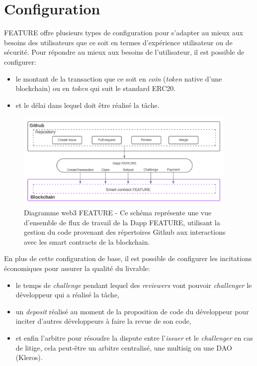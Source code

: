 \documentclass[
	a4paper, %
	10pt, %
	unnumberedsections, %
	twoside, %
]{LTJournalArticle}
\begin{document}
\section{Configuration}

FEATURE offre plusieurs types de configuration pour s'adapter au mieux aux besoins des utilisateurs que ce soit en termes d'expérience utilisateur ou de sécurité. Pour répondre au mieux aux besoins de l'utilisateur, il est possible de configurer:

\begin{itemize}
\item
  le montant de la transaction que ce soit en \emph{coin} (\emph{token} native d'une blockchain) ou en \emph{token} qui suit le standard ERC20.
\item
  et le délai dans lequel doit être réalisé la tâche.
\end{itemize}

\begin{figure}[ht]
  \centering
  \includegraphics[width=0.95\textwidth]{media/diagram_web3_Feature.png}
  \caption{Diagramme web3 FEATURE - Ce schéma représente une vue d'ensemble de flux de travail de la Dapp FEATURE, utilisant la gestion du code provenant des répertoires Github aux interactions avec les smart contracts de la blockchain.}
  \label{fig:web3 diagram}
\end{figure}

En plus de cette configuration de base, il est possible de configurer les incitations économiques pour assurer la qualité du livrable:

\begin{itemize}
\item
  le temps de \emph{challenge} pendant lequel des \emph{reviewers} vont pouvoir \emph{challenger} le développeur qui a réalisé la tâche,
\item
  un \emph{deposit} réalisé au moment de la proposition de code du développeur pour inciter d'autres développeurs à faire la revue de son code,
\item
  et enfin l'arbitre pour résoudre la dispute entre l'\emph{issuer} et le \emph{challenger} en cas de litige, cela peut-être un arbitre centralisé, une multisig ou une DAO (Kleros).
\end{itemize}
\end{document}
